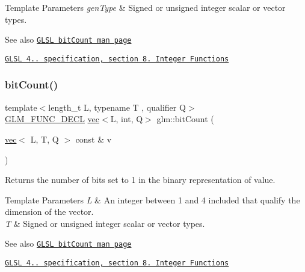 \begin{DoxyTemplParams}{Template Parameters}
{\em gen\+Type} & Signed or unsigned integer scalar or vector types.\\
\hline
\end{DoxyTemplParams}
\begin{DoxySeeAlso}{See also}
\href{http://www.opengl.org/sdk/docs/manglsl/xhtml/bitCount.xml}{\tt G\+L\+SL bit\+Count man page} 

\href{http://www.opengl.org/registry/doc/GLSLangSpec.4.20.8.pdf}{\tt G\+L\+SL 4.. specification, section 8. Integer Functions} 
\end{DoxySeeAlso}
\mbox{\label{group__core__func__integer_gaac7b15e40bdea8d9aa4c4cb34049f7b5}} 
\subsubsection{\texorpdfstring{bit\+Count()}{bitCount()}\hspace{0.1cm}{\footnotesize\ttfamily [2/2]}}
{\footnotesize\ttfamily template$<$length\+\_\+t L, typename T , qualifier Q$>$ \\
\hyperlink{setup_8hpp_ab2d052de21a70539923e9bcbf6e83a51}{G\+L\+M\+\_\+\+F\+U\+N\+C\+\_\+\+D\+E\+CL} \hyperlink{structglm_1_1vec}{vec}$<$L, int, Q$>$ glm\+::bit\+Count (\begin{DoxyParamCaption}\item[{\hyperlink{structglm_1_1vec}{vec}$<$ L, T, Q $>$ const \&}]{v }\end{DoxyParamCaption})}

Returns the number of bits set to 1 in the binary representation of value.


\begin{DoxyTemplParams}{Template Parameters}
{\em L} & An integer between 1 and 4 included that qualify the dimension of the vector. \\
\hline
{\em T} & Signed or unsigned integer scalar or vector types.\\
\hline
\end{DoxyTemplParams}
\begin{DoxySeeAlso}{See also}
\href{http://www.opengl.org/sdk/docs/manglsl/xhtml/bitCount.xml}{\tt G\+L\+SL bit\+Count man page} 

\href{http://www.opengl.org/registry/doc/GLSLangSpec.4.20.8.pdf}{\tt G\+L\+SL 4.. specification, section 8. Integer Functions} 
\end{DoxySeeAlso}
\mbox{\label{group__core__func__integer_ga346b25ab11e793e91a4a69c8aa6819f2}} 
